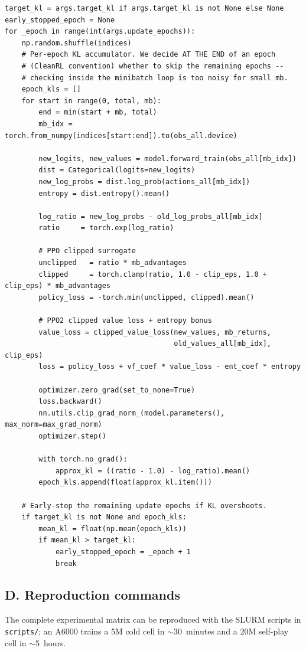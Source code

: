 \begin{lstlisting}
target_kl = args.target_kl if args.target_kl is not None else None
early_stopped_epoch = None
for _epoch in range(int(args.update_epochs)):
    np.random.shuffle(indices)
    # Per-epoch KL accumulator. We decide AT THE END of an epoch
    # (CleanRL convention) whether to skip the remaining epochs --
    # checking inside the minibatch loop is too noisy for small mb.
    epoch_kls = []
    for start in range(0, total, mb):
        end = min(start + mb, total)
        mb_idx = torch.from_numpy(indices[start:end]).to(obs_all.device)

        new_logits, new_values = model.forward_train(obs_all[mb_idx])
        dist = Categorical(logits=new_logits)
        new_log_probs = dist.log_prob(actions_all[mb_idx])
        entropy = dist.entropy().mean()

        log_ratio = new_log_probs - old_log_probs_all[mb_idx]
        ratio     = torch.exp(log_ratio)

        # PPO clipped surrogate
        unclipped   = ratio * mb_advantages
        clipped     = torch.clamp(ratio, 1.0 - clip_eps, 1.0 + clip_eps) * mb_advantages
        policy_loss = -torch.min(unclipped, clipped).mean()

        # PPO2 clipped value loss + entropy bonus
        value_loss = clipped_value_loss(new_values, mb_returns,
                                        old_values_all[mb_idx], clip_eps)
        loss = policy_loss + vf_coef * value_loss - ent_coef * entropy

        optimizer.zero_grad(set_to_none=True)
        loss.backward()
        nn.utils.clip_grad_norm_(model.parameters(), max_norm=max_grad_norm)
        optimizer.step()

        with torch.no_grad():
            approx_kl = ((ratio - 1.0) - log_ratio).mean()
        epoch_kls.append(float(approx_kl.item()))

    # Early-stop the remaining update epochs if KL overshoots.
    if target_kl is not None and epoch_kls:
        mean_kl = float(np.mean(epoch_kls))
        if mean_kl > target_kl:
            early_stopped_epoch = _epoch + 1
            break
\end{lstlisting}

\subsection*{D. Reproduction commands}

The complete experimental matrix can be reproduced with the SLURM scripts
in \texttt{scripts/}; an A6000 trains a 5M cold cell in $\sim$30~minutes
and a 20M self-play cell in $\sim$5~hours.


